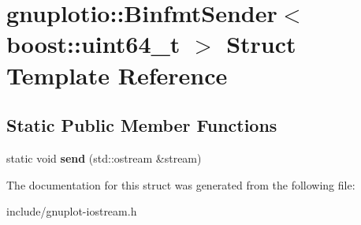\hypertarget{structgnuplotio_1_1BinfmtSender_3_01boost_1_1uint64__t_01_4}{}\section{gnuplotio\+:\+:Binfmt\+Sender$<$ boost\+:\+:uint64\+\_\+t $>$ Struct Template Reference}
\label{structgnuplotio_1_1BinfmtSender_3_01boost_1_1uint64__t_01_4}
\subsection*{Static Public Member Functions}
\begin{DoxyCompactItemize}
\item 
\mbox{\label{structgnuplotio_1_1BinfmtSender_3_01boost_1_1uint64__t_01_4_a9f57162a6baf940675236235556f62ba}} 
static void {\bfseries send} (std\+::ostream \&stream)
\end{DoxyCompactItemize}


The documentation for this struct was generated from the following file\+:\begin{DoxyCompactItemize}
\item 
include/gnuplot-\/iostream.\+h\end{DoxyCompactItemize}

